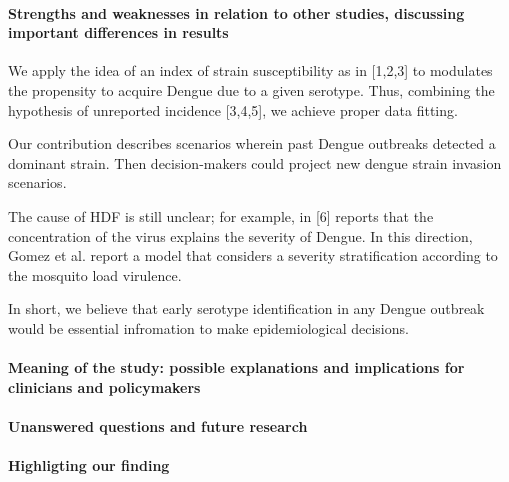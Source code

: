     \paragraph{Strengths and weaknesses in relation 
        to other studies, discussing important
        differences in results}
        
        We apply the idea of an index of strain susceptibility as in [1,2,3] 
    to modulates the propensity to acquire Dengue due to a given serotype.  Thus,
    combining the hypothesis of unreported incidence [3,4,5], we achieve
    proper data fitting.

        Our contribution describes scenarios wherein past Dengue outbreaks
    detected a dominant strain. Then decision-makers could project new
    dengue strain invasion scenarios.

        The cause of HDF is still unclear; for example, in [6] reports that
    the concentration of the virus explains the severity of Dengue. In
    this direction, Gomez et al. report a model that considers a severity
    stratification according to the mosquito load virulence.

        In short, we believe that early serotype identification in any Dengue
    outbreak would be essential infromation to make epidemiological decisions.


    
    
    \paragraph{Meaning of the study: possible explanations 
    and implications for clinicians
    and policymakers}
    \paragraph{Unanswered questions and future research}

\paragraph{Highligting our finding}